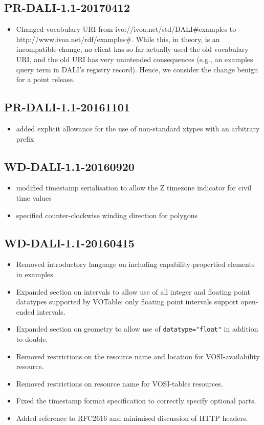\documentclass[11pt,letter]{ivoa}
\begin{document}
\subsection{PR-DALI-1.1-20170412}

\begin{itemize}
\item Changed vocabulary URI from ivo://ivoa.net/std/DALI\#examples to
http://www.ivoa.net/rdf/examples\#.  While this, in theory, is an
incompatible change, no client has so far actually used the old vocabulary
URI, and the old URI has very unintended consequences (e.g., an
examples query term in DALI's registry record).  Hence, we consider the
change benign for a point release.
\end{itemize}

\subsection{PR-DALI-1.1-20161101}

\begin{itemize}
\item added explicit allowance for the use of non-standard xtypes with an
arbitrary prefix
\end{itemize}

\subsection{WD-DALI-1.1-20160920}

\begin{itemize}
\item modified timestamp serialisation to allow the Z timezone indicator for
civil time values
\item specified counter-clockwise winding direction for polygons
\end{itemize}

\subsection{WD-DALI-1.1-20160415}

\begin{itemize}
\item Removed introductory language on including capability-propertied elements in
examples.
\item Expanded section on intervals to allow use of all integer and floating point datatypes
supported by VOTable; only floating point intervals support open-ended intervals.
\item Expanded section on geometry to allow use of \verb|datatype="float"| in addition to double.
\item Removed restrictions on the resource name and location for VOSI-availability resource.
\item Removed restrictions on resource name for VOSI-tables resources.
\item Fixed the timestamp format specification to correctly specify optional parts.
\item Added reference to RFC2616 and minimised discussion of HTTP headers.
\end{itemize}
\end{document}
